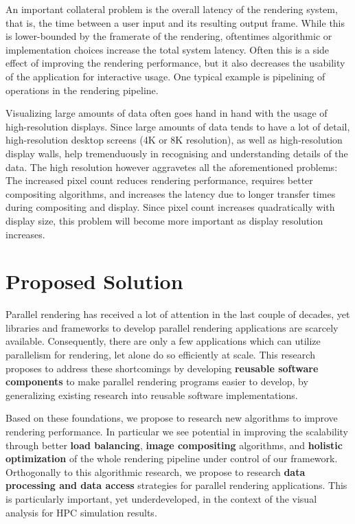 An important collateral problem is the overall latency of the rendering system,
that is, the time between a user input and its resulting output frame. While
this is lower-bounded by the framerate of the rendering, oftentimes algorithmic
or implementation choices increase the total system latency. Often this is a
side effect of improving the rendering performance, but it also decreases the
usability of the application for interactive usage. One typical example is
pipelining of operations in the rendering pipeline.

Visualizing large amounts of data often goes hand in hand with the usage of
high-resolution displays. Since large amounts of data tends to have a lot of
detail, high-resolution desktop screens (4K or 8K resolution), as well as
high-resolution display walls, help tremenduously in recognising and
understanding details of the data. The high resolution however aggravetes all
the aforementioned problems: The increased pixel count reduces rendering
performance, requires better compositing algorithms, and increases the latency
due to longer transfer times during compositing and display. Since pixel count
increases quadratically with display size, this problem will become more
important as display resolution increases.

\section{Proposed Solution} %

Parallel rendering has received a lot of attention in the last couple of
decades, yet libraries and frameworks to develop parallel rendering applications
are scarcely available. Consequently, there are only a few applications which
can utilize parallelism for rendering, let alone do so efficiently at scale.
This research proposes to address these shortcomings by developing {\bf reusable
software components} to make parallel rendering programs easier to develop, by
generalizing existing research into reusable software implementations.

Based on these foundations, we propose to research new algorithms to improve
rendering performance. In particular we see potential in improving the
scalability through better {\bf load balancing}, {\bf image compositing}
algorithms, and {\bf holistic optimization} of the whole rendering pipeline
under control of our framework. Orthogonally to this algorithmic research, we
propose to research {\bf data processing and data access} strategies for
parallel rendering applications. This is particularly important, yet
underdeveloped, in the context of the visual analysis for HPC simulation
results.

